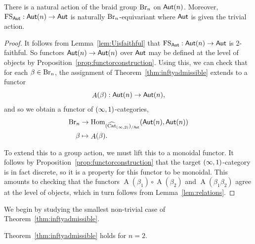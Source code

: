 \begin{cor}\label{cor:action}
    There is a natural action of the braid group $\operatorname{Br}_n$ on $\mathsf{Aut}(n)$. Moreover, $\operatorname{FS}_{\mathsf{Aut}}:\mathsf{Aut}(n)\to\mathsf{Aut}$ is naturally $\operatorname{Br}_n$-equivariant where $\mathsf{Aut}$ is given the trivial action.
\end{cor}

\begin{proof}
    It follows from Lemma~\ref{lem:Uisfaithful} that $\operatorname{FS}_{\mathsf{Aut}}:\mathsf{Aut}(n)\to\mathsf{Aut}$ is 2-faithful. So functors $\mathsf{Aut}(n)\to \mathsf{Aut}(n)$ over $\mathsf{Aut}$ may be defined at the level of objects by Proposition~\ref{prop:functorconstruction}. Using this, we can check that for each $\beta\in\operatorname{Br}_n$, the assignment of Theorem~\ref{thm:inftyadmissible} extends to a functor
    \[\mathop{A}(\beta): \mathsf{Aut}(n)\to\mathsf{Aut}(n),\]
    and so we obtain a functor of $(\infty,1)$-categories,
    \begin{align*}
        \operatorname{Br}_n&\to \operatorname{Hom}_{(\widehat{\operatorname{Cat}}_{(\infty,2)})_{/\mathsf{Aut}}}(\mathsf{Aut}(n),\mathsf{Aut}(n))\\
        \beta&\mapsto \mathop{A}(\beta).
    \end{align*}
    
    To extend this to a group action, we must lift this to a monoidal functor. It follows by Proposition~\ref{prop:functorconstruction} that the target $(\infty,1)$-category is in fact discrete, so it is a property for this functor to be monoidal. This amounts to checking that the functors $\mathop{A}(\beta_1)\circ \mathop{A}(\beta_2)$ and $\mathop{A}(\beta_1\beta_2)$ agree at the level of objects, which in turn follows from Lemma~\ref{lem:relations}.
\end{proof}

We begin by studying the smallest non-trivial case of Theorem~\ref{thm:inftyadmissible}.
\begin{lem}\label{lem:nistwo}
    Theorem~\ref{thm:inftyadmissible} holds for $n=2$.
\end{lem}

